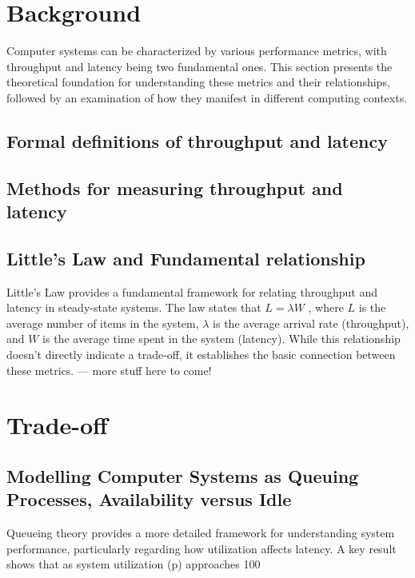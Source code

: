 \documentclass[english,12pt,a4paper,pdftex,sci,utf8]{aaltothesis}
\begin{document}
\section{Background} \label{sec:background}

Computer systems can be characterized by various performance metrics, with throughput and latency being two fundamental ones. This section presents the theoretical foundation for understanding these metrics and their relationships, followed by an examination of how they manifest in different computing contexts.

\subsection{Formal definitions of throughput and latency}

\subsection{Methods for measuring throughput and latency}

\subsection{Little's Law and Fundamental relationship}

Little's Law provides a fundamental framework for relating throughput and latency in steady-state systems. The law states that $L=\lambda W$ , where $L$ is the average number of items in the system, $\lambda$ is the average arrival rate (throughput), and $W$ is the average time spent in the system (latency). While this relationship doesn't directly indicate a trade-off, it establishes the basic connection between these metrics. \bigskip
--- more stuff here to come!


\section{Trade-off} \label{sec:tradeoff}
\subsection{Modelling Computer Systems as Queuing Processes, Availability versus Idle}
Queueing theory provides a more detailed framework for understanding system performance, particularly regarding how utilization affects latency. A key result shows that as system utilization (p) approaches 100%
\end{document}

